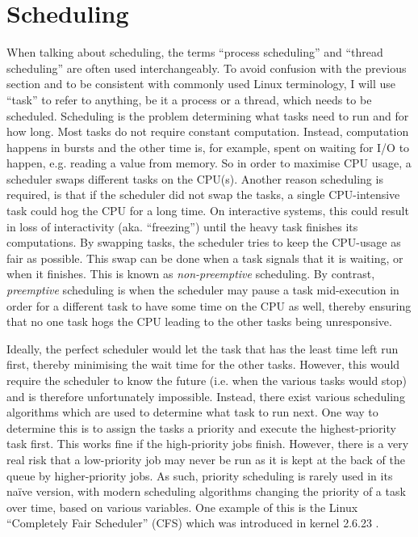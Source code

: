 \section{Scheduling}
When talking about scheduling, the terms ``process scheduling'' and ``thread
scheduling'' are often used interchangeably. To avoid confusion with the
previous section and to be consistent with commonly used Linux terminology, I
will use ``task'' to refer to anything, be it a process or a thread, which needs
to be scheduled. Scheduling is the problem determining what tasks need to run
and for how long. Most tasks do not require constant computation. Instead,
computation happens in bursts and the other time is, for example, spent on
waiting for I/O to happen, e.g. reading a value from memory. So in order to
maximise CPU usage, a scheduler swaps different tasks on the CPU(s). Another
reason scheduling is required, is that if the scheduler did not swap the tasks,
a single CPU-intensive task could hog the CPU for a long time. On interactive
systems, this could result in loss of interactivity (aka. ``freezing'') until
the heavy task finishes its computations. By swapping tasks, the scheduler tries
to keep the CPU-usage as fair as possible. This swap can be done when a task
signals that it is waiting, or when it finishes. This is known as
\textit{non-preemptive} scheduling. By contrast, \textit{preemptive} scheduling
is when the scheduler may pause a task mid-execution in order for a different
task to have some time on the CPU as well, thereby ensuring that no one task
hogs the CPU leading to the other tasks being unresponsive.

Ideally, the perfect scheduler would let the task that has the least time left
run first, thereby minimising the wait time for the other tasks. However, this
would require the scheduler to know the future (i.e. when the various tasks
would stop) and is therefore unfortunately impossible. Instead, there exist
various scheduling algorithms which are used to determine what task to run next.
One way to determine this is to assign the tasks a priority and execute the
highest-priority task first. This works fine if the high-priority jobs finish.
However, there is a very real risk that a low-priority job may never be run as
it is kept at the back of the queue by higher-priority jobs. As such, priority
scheduling is rarely used in its na{\" i}ve version, with modern scheduling
algorithms changing the priority of a task over time, based on various
variables. One example of this is the Linux ``Completely Fair Scheduler'' (CFS)
which was introduced in kernel 2.6.23
\cite{noauthor_cfs_nodate}.

